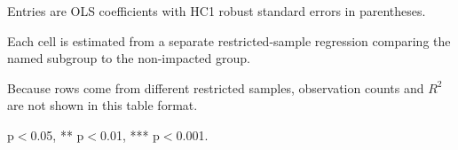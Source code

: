 \begin{table}[!htbp]
\begin{threeparttable}
\begin{tabular}{lcccc}
\bottomrule
\end{tabular}
\begin{tablenotes}[flushleft]
\footnotesize
\item Entries are OLS coefficients with HC1 robust standard errors in parentheses.
\item Each cell is estimated from a separate restricted-sample regression comparing the named subgroup to the non-impacted group.
\item Because rows come from different restricted samples, observation counts and $R^2$ are not shown in this table format.
\item * p$<$0.05, ** p$<$0.01, *** p$<$0.001.
\end{tablenotes}
\end{threeparttable}
\end{table}

